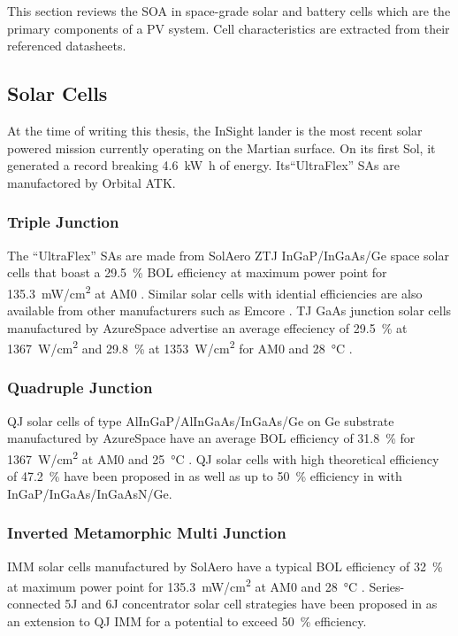 This section reviews the \ac{SOA} in space-grade solar and battery cells which are the primary components of a \ac{PV} system. Cell characteristics are extracted from their referenced datasheets.

\subsection{Solar Cells}
At the time of writing this thesis, the InSight lander is the most recent solar powered mission currently operating on the Martian surface. On its first Sol, it generated a record breaking \SI{4.6}{\kilo\watt\hour} of energy. Its``UltraFlex'' \acp{SA} are manufactored by Orbital ATK.

\subsubsection{Triple Junction}
The ``UltraFlex'' \acp{SA} are made from SolAero \ac{ZTJ} \ac{InGaP}/\ac{InGaAs}/\ac{Ge} space solar cells that boast a \SI{29.5}{\percent} \ac{BOL} efficiency at maximum power point for \SI{135.3}{\milli\watt/\centi\meter^{2}} at \ac{AM0} . Similar solar cells with idential efficiencies are also available from other manufacturers such as Emcore . \ac{TJ} \ac{GaAs} junction solar cells manufactured by AzureSpace advertise an average effeciency of \SI{29.5}{\percent} at \SI{1367}{\watt/\centi\meter^{2}} and \SI{29.8}{\percent} at \SI{1353}{\watt/\centi\meter^{2}} for \ac{AM0} and \SI{28}{\celsius} .

\subsubsection{Quadruple Junction}
\ac{QJ} solar cells of type \ac{AlInGaP}/\ac{AlInGaAs}/\ac{InGaAs}/\ac{Ge} on \ac{Ge} substrate manufactured by AzureSpace have an average \ac{BOL} efficiency of \SI{31.8}{\percent} for \SI{1367}{\watt/\centi\meter^{2}} at \ac{AM0} and \SI{25}{\celsius} . \ac{QJ} solar cells with high theoretical efficiency of \SI{47.2}{\percent} have been proposed in  as well as up to \SI{50}{\percent} efficiency in  with \ac{InGaP}/\ac{InGaAs}/\ac{InGaAsN}/\ac{Ge}.

\subsubsection{Inverted Metamorphic Multi Junction}
\ac{IMM} solar cells manufactured by SolAero have a typical \ac{BOL} efficiency of \SI{32}{\percent} at maximum power point for \SI{135.3}{\milli\watt/\centi\meter^{2}} at \ac{AM0} and \SI{28}{\celsius} . Series-connected \ac{5J} and \ac{6J} concentrator solar cell strategies have been proposed in  as an extension to \ac{QJ} \ac{IMM} for a potential to exceed \SI{50}{\percent} efficiency.

